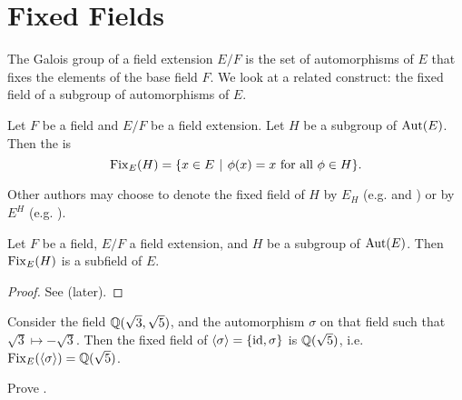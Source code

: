 \section{Fixed Fields}
The Galois group of a field extension $E/F$ is the set of automorphisms of $E$ that fixes the elements of the base field $F$. We look at a related construct: the fixed field of a subgroup of automorphisms of $E$.

\begin{definition}
    Let $F$ be a field and $E/F$ be a field extension. Let $H$ be a subgroup of $\mathrm{Aut}(E)$. Then the  is
    \[
        \Fix{E}{H} = \{x \in E \vert \phi(x) = x \text{ for all } \phi \in H\}.
    \]
\end{definition}
\begin{remark}
    Other authors may choose to denote the fixed field of $H$ by $E_H$ (e.g. \cite[p.~531]{gallian_2016} and \cite[p.~298]{judson_beezer_2022}) or by $E^H$ (e.g. \cite[p.~486]{artin_2011}).
\end{remark}

\begin{proposition}\label{prop-fixed-field-is-subfield}
    Let $F$ be a field, $E/F$ a field extension, and $H$ be a subgroup of $\mathrm{Aut}(E)$. Then $\mathrm{Fix}_{E}(H)$ is a subfield of $E$.
\end{proposition}
\begin{proof}
    See  (later).
\end{proof}

\begin{example}
    Consider the field $\mathbb{Q}(\sqrt3,\sqrt5)$, and the automorphism $\sigma$ on that field such that $\sqrt3 \mapsto -\sqrt3$. Then the fixed field of $\langle\sigma\rangle = \{\mathrm{id}, \sigma\}$ is $\mathbb{Q}(\sqrt5)$, i.e. $\mathrm{Fix}_{E}(\langle\sigma\rangle) = \mathbb{Q}(\sqrt5)$.
\end{example}

\begin{exercise}\label{exercise-fixed-field-is-subfield}
    Prove .
\end{exercise}

\pagebreak


